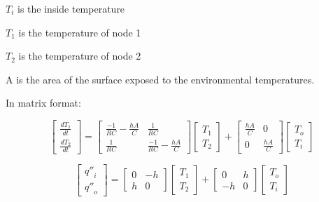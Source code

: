 \({T_i}\) is the inside temperature

\({T_1}\) is the temperature of node 1

\({T_2}\) is the temperature of node 2

A is the area of the surface exposed to the environmental temperatures.

In matrix format:

\begin{equation}
\left[ {\begin{array}{*{20}{c}}{\frac{{d{T_1}}}{{dt}}}\\ {\frac{{d{T_2}}}{{dt}}}\end{array}} \right] = \left[ {\begin{array}{*{20}{c}}{\frac{{ - 1}}{{RC}} - \frac{{hA}}{C}}&{\frac{1}{{RC}}}\\ {\frac{1}{{RC}}}&{\frac{{ - 1}}{{RC}} - \frac{{hA}}{C}}\end{array}} \right]\left[ {\begin{array}{*{20}{c}}{{T_1}}\\ {{T_2}}\end{array}} \right] + \left[ {\begin{array}{*{20}{c}}{\frac{{hA}}{C}}&0\\0&{\frac{{hA}}{C}}\end{array}} \right]\left[ {\begin{array}{*{20}{c}}{{T_o}}\\ {{T_i}}\end{array}} \right]
\label{eq:QTFDeriv640}
\end{equation}

\begin{equation}
\left[ {\begin{array}{*{20}{c}}{{{q''}_i}}\\ {{{q''}_o}}\end{array}} \right] = \left[ {\begin{array}{*{20}{c}}0&{ - h}\\h&0\end{array}} \right]\left[ {\begin{array}{*{20}{c}}{{T_1}}\\ {{T_2}}\end{array}} \right] + \left[ {\begin{array}{*{20}{c}}0&h\\ { - h}&0\end{array}} \right]\left[ {\begin{array}{*{20}{c}}{{T_o}}\\ {{T_i}}\end{array}} \right]
\end{equation}

